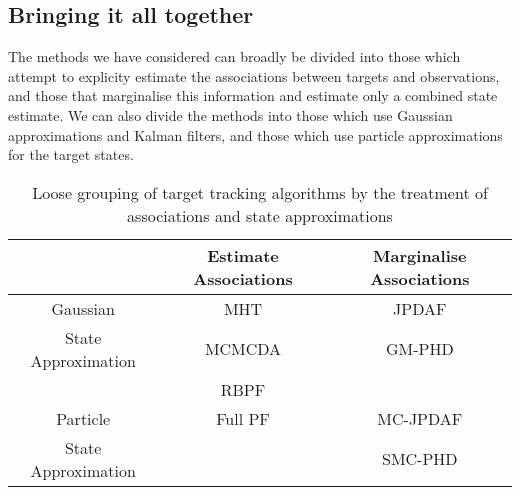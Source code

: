 \subsection{Bringing it all together}
The methods we have considered can broadly be divided into those which attempt to explicity estimate the associations between targets and observations, and those that marginalise this information and estimate only a combined state estimate. We can also divide the methods into those which use Gaussian approximations and Kalman filters, and those which use particle approximations for the target states.

\begin{table}[!hbt]%
\begin{center}\begin{tabular}{|c|c|c|}
\hline
 & Estimate Associations & Marginalise Associations\\
\hline
Gaussian & MHT & JPDAF \\
State Approximation & MCMCDA & GM-PHD \\ 
 & RBPF & \\
\hline
Particle & Full PF & MC-JPDAF \\
State Approximation & & SMC-PHD \\
\hline
\end{tabular}\end{center}
\caption{Loose grouping of target tracking algorithms by the treatment of associations and state approximations}
\label{}
\end{table}
